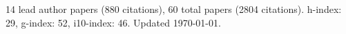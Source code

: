 14 lead author papers (880 citations),
60 total papers (2804 citations).\newline
h-index: 29, g-index: 52, i10-index: 46. Updated \today.
